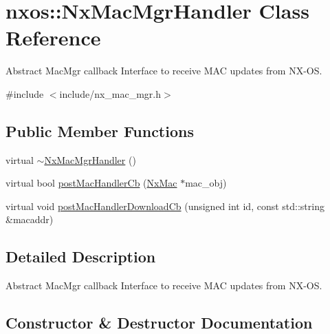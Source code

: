 \hypertarget{classnxos_1_1_nx_mac_mgr_handler}{}\section{nxos\+:\+:Nx\+Mac\+Mgr\+Handler Class Reference}
\label{classnxos_1_1_nx_mac_mgr_handler}


Abstract Mac\+Mgr callback Interface to receive M\+AC updates from N\+X-\/\+OS.  




{\ttfamily \#include $<$include/nx\+\_\+mac\+\_\+mgr.\+h$>$}

\subsection*{Public Member Functions}
\begin{DoxyCompactItemize}
\item 
virtual \mbox{\hyperlink{classnxos_1_1_nx_mac_mgr_handler_a4eef592d5890b37c3d26faf679aefbb2}{$\sim$\+Nx\+Mac\+Mgr\+Handler}} ()
\item 
virtual bool \mbox{\hyperlink{classnxos_1_1_nx_mac_mgr_handler_a3a15935d8cd001a554d32a5d7ab216b5}{post\+Mac\+Handler\+Cb}} (\mbox{\hyperlink{classnxos_1_1_nx_mac}{Nx\+Mac}} $\ast$mac\+\_\+obj)
\item 
virtual void \mbox{\hyperlink{classnxos_1_1_nx_mac_mgr_handler_a42d84c9f4da1211024912efd4416827e}{post\+Mac\+Handler\+Download\+Cb}} (unsigned int id, const std\+::string \&macaddr)
\end{DoxyCompactItemize}


\subsection{Detailed Description}
Abstract Mac\+Mgr callback Interface to receive M\+AC updates from N\+X-\/\+OS. 

\subsection{Constructor \& Destructor Documentation}
\mbox{\label{classnxos_1_1_nx_mac_mgr_handler_a4eef592d5890b37c3d26faf679aefbb2}} 
